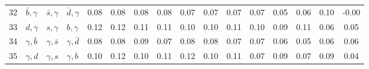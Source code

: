 \begin{tabularx}{\textwidth}{rXXX@{}S@{}S@{}S@{}S@{}S@{}S@{}S@{}S@{}S@{}S@{}S@{}S}
 32 & $\bar b,\gamma$  & $\bar s,\gamma$  & $\bar d,\gamma$ &  0.08 &  0.08 &  0.08 &  0.08 &  0.07 &  0.07 &  0.07 &  0.07 &  0.05 &  0.06 &  0.10 & -0.00 \\
 33 & $d,\gamma$       & $s,\gamma$       & $b,\gamma$      &  0.12 &  0.12 &  0.11 &  0.11 &  0.10 &  0.10 &  0.11 &  0.10 &  0.09 &  0.11 &  0.06 &  0.05 \\
 34 & $\gamma,\bar b$  & $\gamma,\bar s$  & $\gamma,\bar d$ &  0.08 &  0.08 &  0.09 &  0.07 &  0.08 &  0.08 &  0.07 &  0.07 &  0.06 &  0.05 &  0.06 &  0.06 \\
 35 & $\gamma,d$       & $\gamma,s$       & $\gamma, b$     &  0.10 &  0.12 &  0.10 &  0.11 &  0.12 &  0.10 &  0.11 &  0.07 &  0.09 &  0.07 &  0.09 &  0.04 \\
 \bottomrule
\end{tabularx}
